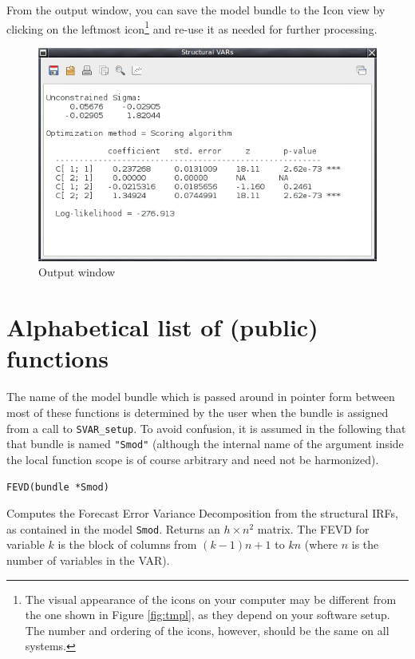 \documentclass[a4paper,10pt]{article}
\newenvironment{funcdoc}[1]
{\noindent\hrulefill\newline\nopagebreak\texttt{#1}%
\nopagebreak\par\noindent\hrulefill%
\nopagebreak\par\nopagebreak\smallskip\nopagebreak\par}
{\bigskip}
\begin{document}
From the output window, you can save the model bundle to the Icon view
by clicking on the leftmost icon\footnote{The visual appearance of the
  icons on your computer may be different from the one shown in Figure
  \ref{fig:tmpl}, as they depend on your software setup.  The number
  and ordering of the icons, however, should be the same on all
  systems.} and re-use it as needed for further processing.
\begin{figure}[htbp]
  \centering
  \includegraphics[scale=0.5]{Output.png}
  \caption{Output window}
  \label{fig:GUI-output}
\end{figure}

\clearpage

\section{Alphabetical list of (public) functions}
\label{sec:syntax}

The name of the model bundle which is passed around in pointer form between 
most of these functions is determined by the user when the bundle is assigned
from a call to \texttt{SVAR\_setup}. To avoid confusion, it is assumed in the
following that that bundle is named \texttt{"Smod"} (although the internal 
name of the argument inside the local function scope is of course arbitrary 
and need not be harmonized). 


\begin{funcdoc}{FEVD(bundle *Smod)}
  Computes the Forecast Error Variance Decomposition from the
  structural IRFs, as contained in the model \texttt{Smod}. Returns
  an $h \times n^2$ matrix. The FEVD for variable $k$ is the block of
  columns from $(k-1) n + 1$ to $k n$ (where $n$ is the number of
  variables in the VAR).
\end{funcdoc}
\end{document}
